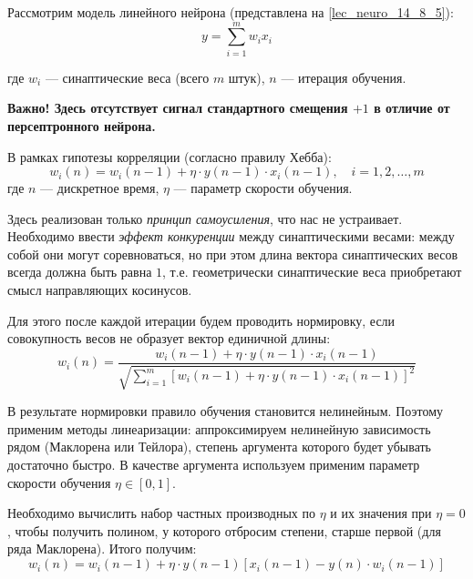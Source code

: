 \documentclass{article}
\numberwithin{equation}{subsection}
\begin{document}
Рассмотрим модель линейного нейрона (представлена на \ref{lec_neuro_14_8_5}):
\begin{equation}
    y = \sum_{i=1}^m w_i x_i
\end{equation}

\noindent
где $w_i$ --- синаптические веса (всего $m$ штук), $n$ --- итерация обучения.

\begin{myquote}
    \textbf{Важно!
    Здесь отсутствует сигнал стандартного смещения $+1$ в отличие от персептронного нейрона.}
\end{myquote}

В рамках гипотезы корреляции (согласно правилу Хебба):
\begin{equation}
    w_i (n) = w_i (n-1) + \eta \cdot y(n-1) \cdot x_i(n-1), \quad i=1, 2, \dots, m
\end{equation}
\noindent
где $n$ --- дискретное время, $\eta$ --- параметр скорости обучения.

Здесь реализован только \textit{принцип самоусиления}, что нас не устраивает. 
Необходимо ввести \textit{эффект конкуренции} между синаптическими весами: между собой они могут 
соревноваться, но при этом длина вектора синаптических весов всегда должна быть 
равна $1$, т.е. геометрически синаптические веса приобретают смысл направляющих косинусов.

Для этого после каждой итерации будем проводить нормировку, если совокупность весов не 
образует вектор единичной длины:
\begin{equation}
    w_i(n) = \dfrac{w_i(n-1) + \eta \cdot y(n-1) \cdot x_i(n-1)}
                   {\sqrt{\sum_{i=1}^{m} \left[ w_i(n-1) + \eta \cdot y(n-1) \cdot x_i(n-1) 
                                         \right] ^2}}
\end{equation}

В результате нормировки правило обучения становится нелинейным.
Поэтому применим методы линеаризации: аппроксимируем нелинейную зависимость рядом (Маклорена 
или Тейлора), степень аргумента которого будет убывать достаточно быстро.
В качестве аргумента используем применим параметр скорости обучения $\eta \in [0,1]$.

Необходимо вычислить набор частных производных по $\eta$ и их значения при $\eta=0$,
чтобы получить полином, у которого отбросим степени, старше первой (для ряда Маклорена). 
Итого получим:
\begin{equation}
    w_i(n) = w_i(n-1) + \eta \cdot y(n-1) \left[ x_i(n-1) - y(n) \cdot w_i(n-1) \right]
\end{equation}
\end{document}
